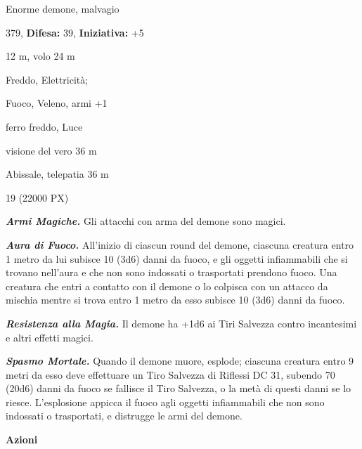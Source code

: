 \begin{multicols}{2}
{
\noindent
\begin{description}[noitemsep, topsep=0pt, parsep=0pt, partopsep=0pt, leftmargin=0cm, labelwidth=2.2cm]
	\item[\textbf{Taglia/Tipo:}] Enorme demone, malvagio
	\item[\textbf{Caratt.:}] 
	\item[\textbf{Punti Ferita:}] 379,  \textbf{Difesa:} 39,  \textbf{Iniziativa:} +5
	\item[\textbf{Movimento:}] 12 m, volo 24 m
	\item[\textbf{Tiri Salvez.:}] 
	\item[\textbf{Res. Danni:}] Freddo, Elettricità;
	\item[\textbf{Imm. Danni:}] Fuoco, Veleno, armi +1
	\item[\textbf{Vulnerabilità:}] ferro freddo, Luce
	\item[\textbf{Sensi:}] visione del vero 36 m
	\item[\textbf{Linguaggi:}] Abissale, telepatia 36 m
	\item[\textbf{Sfida:}] 19 (22000 PX)\smallskip
\end{description}

\emph{\textbf{Armi Magiche.}} Gli attacchi con arma del demone sono magici.

\emph{\textbf{Aura di Fuoco.}} All'inizio di ciascun round del demone, ciascuna creatura entro 1 metro da lui subisce 10 (3d6) danni da fuoco, e gli oggetti infiammabili che si trovano nell'aura e che non sono indossati o trasportati prendono fuoco. Una creatura che entri a contatto con il demone o lo colpisca con un attacco da mischia mentre si trova entro 1 metro da esso subisce 10 (3d6) danni da fuoco.

\emph{\textbf{Resistenza alla Magia.}} Il demone ha +1d6 ai Tiri Salvezza contro incantesimi e altri effetti magici.

\emph{\textbf{Spasmo Mortale.}} Quando il demone muore, esplode; ciascuna creatura entro 9 metri da esso deve effettuare un Tiro Salvezza di Riflessi DC 31, subendo 70 (20d6) danni da fuoco se fallisce il Tiro Salvezza, o la metà di questi danni se lo riesce. L'esplosione appicca il fuoco agli oggetti infiammabili che non sono indossati o trasportati, e distrugge le armi del demone.

\textbf{Azioni}

}
\end{multicols}
